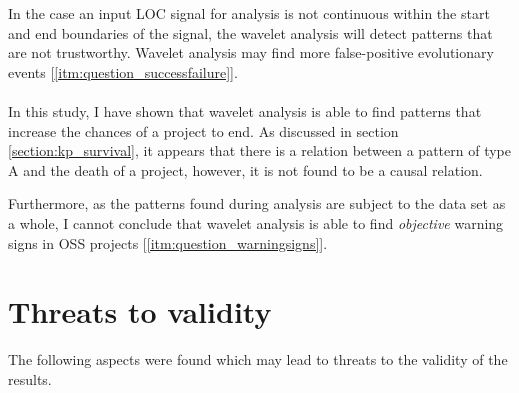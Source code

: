 In the case an input LOC signal for analysis is not continuous within the start
and end boundaries of the signal, the wavelet analysis will detect patterns
that are not trustworthy. Wavelet analysis may find more false-positive
evolutionary events [\ref{itm:question_successfailure}].

\paragraph{}
In this study, I have shown that wavelet analysis is able to find patterns that
increase the chances of a project to end. As discussed in section
\ref{section:kp_survival}, it appears that there is a relation between a
pattern of type A and the death of a project, however, it is not found to be a
causal relation.

Furthermore, as the patterns found during analysis are subject to the data set
as a whole, I cannot conclude that wavelet analysis is able to find
\textit{objective} warning signs in OSS projects
[\ref{itm:question_warningsigns}].

\section{Threats to validity}
The following aspects were found which may lead to threats to the validity of
the results.


